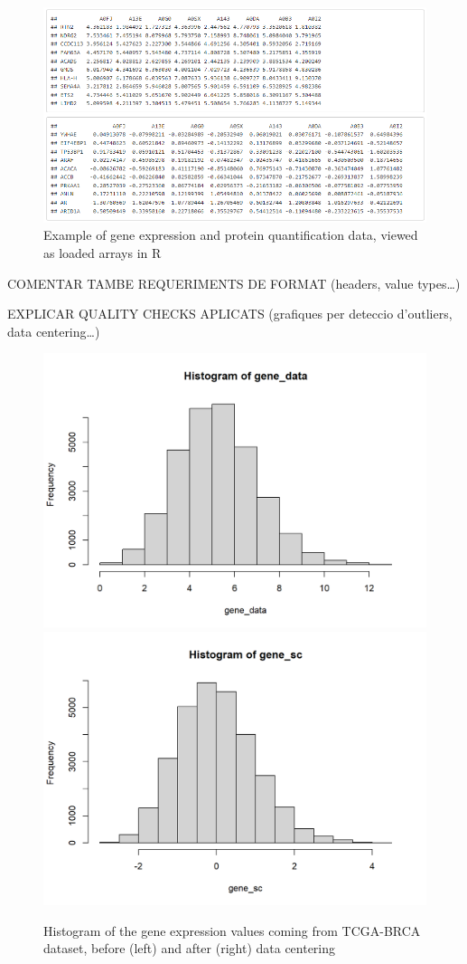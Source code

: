 \documentclass[a4paper, nobind]{templates/ociamthesis}
\begin{document}
\begin{figure}

{\centering \includegraphics[width=0.95\linewidth]{figures/chapter3/3-10_input_data_R_example_2} 

}

\caption[Example of gene and protein data loaded in R]{Example of gene expression and protein quantification data, viewed as loaded arrays in R}\label{fig:fig3-10}
\end{figure}

\clearpage

COMENTAR TAMBE REQUERIMENTS DE FORMAT (headers, value types\ldots)

EXPLICAR QUALITY CHECKS APLICATS (grafiques per deteccio d'outliers, data centering\ldots)

\begin{figure}

{\centering \includegraphics[width=0.48\linewidth]{figures/chapter3/3-13a_mrna_data_unscaled} \includegraphics[width=0.48\linewidth]{figures/chapter3/3-13b_mrna_data_scaled} 

}

\caption[Transcriptomics values before and after centering]{Histogram of the gene expression values coming from TCGA-BRCA dataset, before (left) and after (right) data centering}\label{fig:fig3-13}
\end{figure}
\end{document}
